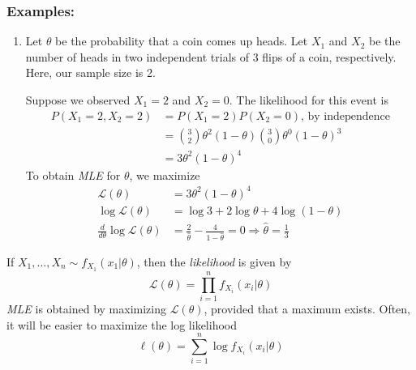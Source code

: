 \documentclass{article}
\begin{document}
\subsubsection{Examples:}
\begin{enumerate}
    \item Let $\theta$ be the probability that a coin comes up heads. Let $X_1$ and $X_2$ be the number of heads in two independent trials of 3 flips of a coin, respectively. Here, our sample size is 2.

    Suppose we observed $X_1 = 2$ and $X_2 = 0$. The likelihood for this event is
    \begin{equation*}
    \begin{split}
        P(X_1=2, X_2 = 2) &= P(X_1 = 2) P(X_2 = 0) \text{, by independence}\\
        &= \binom{3}{2} \theta^2 (1-\theta) \binom{3}{0}\theta^0 (1-\theta)^3\\
        &= 3\theta^2 (1-\theta)^4
    \end{split}
    \end{equation*}
    To obtain \textit{MLE} for $\theta$, we maximize
    \begin{equation*}
        \begin{split}
            \mathcal{L}(\theta) &= 3\theta^2(1-\theta)^4\\
            \log \mathcal{L}(\theta) &= \log 3 + 2\log \theta + 4\log (1-\theta)\\
            \frac{d}{d\theta} \log \mathcal{L}(\theta) &= \frac{2}{\hat{\theta}} - \frac{4}{1-\hat{\theta}} = 0 \Rightarrow \hat{\theta} = \frac{1}{3}
        \end{split}
    \end{equation*}
\end{enumerate}

If $X_1,...,X_n\sim f_{X_1}(x_1|\theta)$, then the \textit{likelihood} is given by
\begin{equation*}
    \mathcal{L}(\theta) = \prod_{i=1}^n f_{X_i}(x_i|\theta)
\end{equation*}
\textit{MLE} is obtained by  maximizing $\mathcal{L}(\theta)$, provided that a maximum exists. Often, it will be easier to maximize the log likelihood
\begin{equation*}
    \ell (\theta) = \sum_{i=1}^n \log f_{X_i}(x_i|\theta)
\end{equation*}
\end{document}
